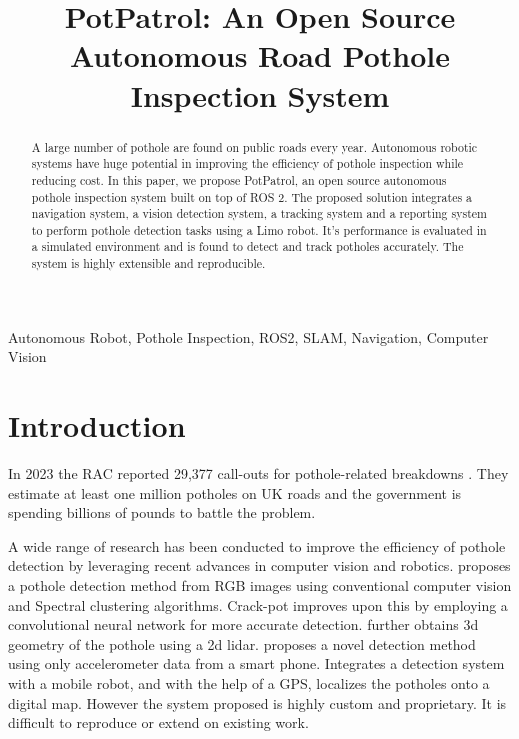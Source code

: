 \documentclass[conference]{IEEEtran}
\begin{document}
\title{PotPatrol: An Open Source Autonomous Road Pothole Inspection System}

\author{
}

\maketitle

\begin{abstract}
A large number of pothole are found on public roads every year. Autonomous robotic systems have huge potential in improving the efficiency of pothole inspection while reducing cost. In this paper, we propose PotPatrol, an open source autonomous pothole inspection system built on top of ROS 2. The proposed solution integrates a navigation system, a vision detection system, a tracking system and a reporting system to perform pothole detection tasks using a Limo robot. It's performance is evaluated in a simulated environment and is found to detect and track potholes accurately. The system is highly extensible and reproducible.
\end{abstract}

\begin{IEEEkeywords}
Autonomous Robot, Pothole Inspection, ROS2, SLAM, Navigation, Computer Vision
\end{IEEEkeywords}

\section{Introduction}

In 2023 the RAC reported 29,377 call-outs for pothole-related breakdowns \cite{RACPotholeIndex}. They estimate at least one million potholes on UK roads and the government is spending billions of pounds to battle the problem.

A wide range of research has been conducted to improve the efficiency of pothole detection by leveraging recent advances in computer vision and robotics. \cite{omanovicPotholeDetectionImage2013} proposes a pothole detection method from RGB images using conventional computer vision and Spectral clustering algorithms. Crack-pot \cite{anandCrackpotAutonomousRoad2018} improves upon this by employing a convolutional neural network for more accurate detection. \cite{kangPotholeDetectionSystem2017} further obtains 3d geometry of the pothole using a 2d lidar. \cite{RealTimePothole} proposes a novel detection method using only accelerometer data from a smart phone.
\cite{brunoRobotizedRaspberryBasedSystem2023} Integrates a detection system with a mobile robot, and with the help of a GPS, localizes the potholes onto a digital map. However the system proposed is highly custom and proprietary. It is difficult to reproduce or extend on existing work.
\end{document}
